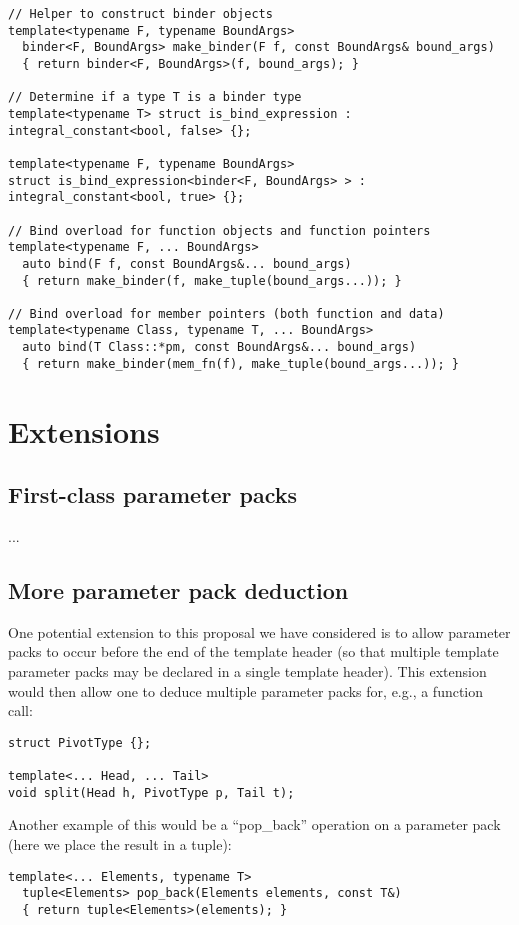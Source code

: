 \documentclass{article}
\begin{document}
\begin{verbatim}
// Helper to construct binder objects
template<typename F, typename BoundArgs>
  binder<F, BoundArgs> make_binder(F f, const BoundArgs& bound_args)
  { return binder<F, BoundArgs>(f, bound_args); }

// Determine if a type T is a binder type
template<typename T> struct is_bind_expression : integral_constant<bool, false> {};

template<typename F, typename BoundArgs>
struct is_bind_expression<binder<F, BoundArgs> > : integral_constant<bool, true> {};

// Bind overload for function objects and function pointers
template<typename F, ... BoundArgs>
  auto bind(F f, const BoundArgs&... bound_args)
  { return make_binder(f, make_tuple(bound_args...)); }

// Bind overload for member pointers (both function and data)
template<typename Class, typename T, ... BoundArgs>
  auto bind(T Class::*pm, const BoundArgs&... bound_args)
  { return make_binder(mem_fn(f), make_tuple(bound_args...)); }
\end{verbatim}
\normalsize

\section{Extensions}
\subsection{First-class parameter packs}
...

\subsection{More parameter pack deduction}
One potential extension to this proposal we have considered is to
allow parameter packs to occur before the end of the template header
(so that multiple template parameter packs may be declared in a single
template header). This extension would then allow one to deduce
multiple parameter packs for, e.g., a function call:

\begin{verbatim}
struct PivotType {};

template<... Head, ... Tail>
void split(Head h, PivotType p, Tail t);
\end{verbatim}

Another example of this would be a ``pop\_back'' operation on a
parameter pack (here we place the result in a tuple):

\begin{verbatim}
template<... Elements, typename T>
  tuple<Elements> pop_back(Elements elements, const T&)
  { return tuple<Elements>(elements); }
\end{verbatim}
\end{document}
